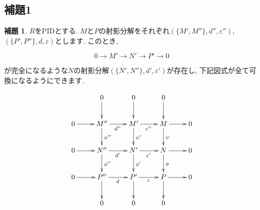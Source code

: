 \documentclass{jsarticle}
\theoremstyle{definition}
\newtheorem{lemma}{補題}
\numberwithin{theorem}{section}
\begin{document}
\subsection{補題1}
\begin{lemma}
$R$をPIDとする. $M$と$P$の射影分解をそれぞれ$(\{M', M''\}, d'', \varepsilon'')$, $(\{P', P''\}, d, \varepsilon)$とします.
このとき,

\begin{equation*}
0\rightarrow M' \rightarrow N' \rightarrow P' \rightarrow 0
\end{equation*}

が完全になるような$N$の射影分解$(\{N', N''\}, d', \varepsilon')$が存在し, 下記図式が全て可換になるようにできます.

\begin{equation*}
\xymatrix{
            & 0 \ar[d] &  0 \ar[d] &  0 \ar[d] & \\
  0 \ar[r] & M'' \ar[r]_{d''} \ar[d]^{\psi''} & M' \ar[r]_{\varepsilon''} \ar[d]^{\psi'} & M \ar[r] \ar[d]^{\psi} & 0 \\
  0 \ar[r] & N'' \ar[r]_{d'} \ar[d]^{\phi''} & N' \ar[r]_{\varepsilon'} \ar[d]^{\phi'} & N \ar[r] \ar[d]^{\phi} & 0 \\
  0 \ar[r] & P'' \ar[r]_{d} \ar[d] & P' \ar[r]_{\varepsilon} \ar[d] & P \ar[r] \ar[d] & 0 \\
            & 0 &  0 &  0 & \\
}
\end{equation*}
\end{lemma}
\end{document}
